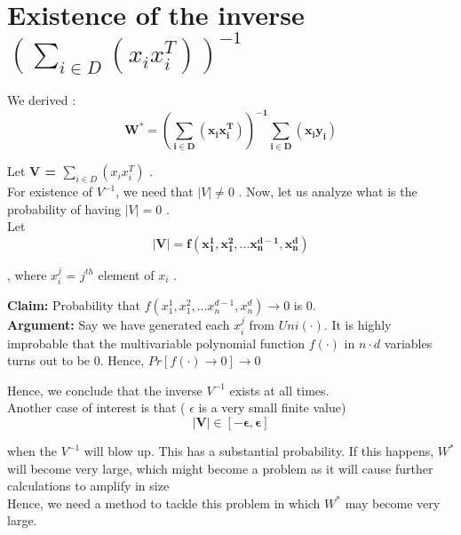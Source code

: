 \documentclass[11pt, twosides]{article}
\begin{document}
\section{Existence of the inverse $(\sum_{i \in D} (x_i x_i^T))^{-1}$}
 
We derived : 
\begin{equation}
    \mathbf{ W^* = (\sum_{i \in D} (x_i x_i^T))^{-1} \sum_{i \in D} (x_i y_i)} 
\end{equation}

Let \textbf{V = $\sum_{i \in D} (x_i x_i^T)$} .\\
For existence of $V^{-1}$, we need that \textbf{$|V| \neq 0 $ }. Now, let us analyze what is the probability of having \textbf{$|V| = 0 $ }.\\
Let
\begin{equation}
    \mathbf{|V| = f( x_1^1, x_1^2, . . . x_n^{d-1}, x_n^d) }
\end{equation}
 \begin{flushright}
 , where $x_i^j$ = $j^{th}$ element of \textbf{$x_i$}  .\\
  \end{flushright}
\textbf{Claim:} Probability that $f( x_1^1, x_1^2, . . . x_n^{d-1}, x_n^d) \rightarrow 0 $ is 0.\\

\textbf{Argument:} Say we have generated each $x_i^j$ from $Uni(\cdot)$. It is highly improbable that the multivariable polynomial function $f(\cdot)$ in $n \cdot d$ variables turns out to be 0. Hence, $Pr[ f(\cdot) \rightarrow 0] \rightarrow 0$

Hence, we conclude that the inverse $V^{-1}$ exists at all times.\\
Another case of interest is that ( $\epsilon$ is a very small finite value)
\begin{equation}
    \mathbf{ |V| \in [-\epsilon,\epsilon] }
\end{equation}

when the $V^{-1}$ will blow up. This has a substantial probability. If this happens, $W^*$ will become very large, which might become a problem as it will cause further calculations to amplify in size\\ 
Hence, we need a method to tackle this problem in which $W^*$ may become very large.
\end{document}
